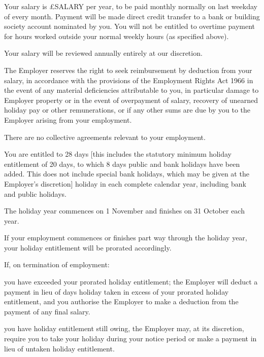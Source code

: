 \documentclass[a4paper,11pt,onecolumn ]{article}
\begin{document}
\begin{legal}
\item {}
\begin{legal}
\item Your salary is £SALARY per year, to be paid monthly normally on last weekday
of every month. Payment will be made direct credit transfer to a bank or
building society account nominated by you. You will not be entitled to overtime
payment for hours worked outside your normal weekly hours (as specified
above).
\item Your salary will be reviewed annually entirely at our discretion.
\item The Employer reserves the right to seek reimbursement by deduction from your
salary, in accordance with the provisions of the Employment Rights Act 1966 in
the event of any material deficiencies attributable to you, in particular damage
to Employer property or in the event of overpayment of salary, recovery of
unearned holiday pay or other remunerations, or if any other sums are due by
you to the Employer arising from your employment.
\end{legal}


\item {}
There are no collective agreements relevant to your employment.

\item {}
\begin{legal}
\item You are entitled to 28 days [this includes the statutory minimum holiday
entitlement of 20 days, to which 8 days public and bank holidays have been
added. This does not include special bank holidays, which may be given at the
Employer’s discretion] holiday in each complete calendar year, including bank
and public holidays.
\item The holiday year commences on 1 November and finishes
on 31 October each year.
\item If your employment commences or finishes part way through the holiday year,
your holiday entitlement will be prorated accordingly.
\item If, on termination of employment:

\begin{legal}
  \item you have exceeded your prorated holiday entitlement; the Employer will
  deduct a payment in lieu of days holiday taken in excess of your prorated
  holiday entitlement, and you authorise the Employer to make a deduction
  from the payment of any final salary.
  \item you have holiday entitlement still owing, the Employer may, at its
  discretion, require you to take your holiday during your notice period or
  make a payment in lieu of untaken holiday entitlement.
\end{legal}


\end{legal}
\end{legal}
\end{document}
